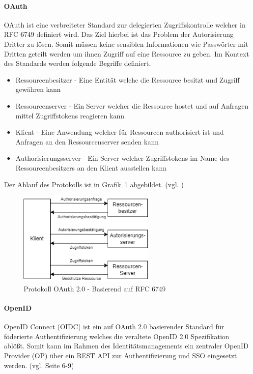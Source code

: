 \documentclass[11pt]{article}
\begin{document}
\paragraph{OAuth}
OAuth ist eine verbreiteter Standard zur delegierten Zugriffskontrolle welcher in RFC 6749 definiert wird. Das Ziel hierbei ist das Problem der Autorisierung Dritter zu lösen. Somit müssen keine sensiblen Informationen wie Passwörter mit Dritten geteilt werden um ihnen Zugriff auf eine Ressource zu geben. Im Kontext des Standards werden folgende Begriffe definiert.
\begin{itemize}
  \item Ressourcenbesitzer - Eine Entität welche die Ressource besitzt und Zugriff gewähren kann
  \item Ressourcenserver - Ein Server welcher die Ressource hostet und auf Anfragen mittel Zugriffstokens reagieren kann
  \item Klient - Eine Anwendung welcher für Ressourcen authorisiert ist und Anfragen an den Ressourcenserver senden kann
  \item Authorisierungsserver - Ein Server welcher Zugriffstokens im Name des Ressourcenbesitzers an den Klient ausstellen kann
\end{itemize}
Der Ablauf des Protokolls ist in Grafik~\cref{fig:oauth} abgebildet. (vgl. \cite{rfc6749})
\begin{figure}[H]
  \centering
  \includegraphics[width=0.6\textwidth]{assets/oauth.png}
  \caption{Protokoll OAuth 2.0 - Basierend auf RFC 6749}\label{fig:oauth}
\end{figure}
\paragraph{OpenID}
OpenID Connect (OIDC) ist ein auf OAuth 2.0 basierender Standard für föderierte Authentifizierung welches die veraltete OpenID 2.0 Spezifikation ablößt. Somit kann im Rahmen des Identitätsmanagements ein zentraler OpenID Provider (OP) über ein REST API zur Authentifizierung und SSO eingesetzt werden. (vgl. \cite{naik2017choice} Seite 6-9)
\end{document}
